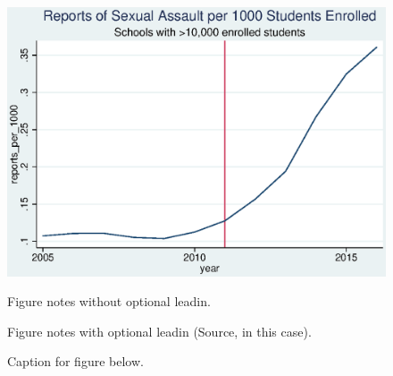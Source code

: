 \documentclass[AER]{AEA}
\begin{document}
\clearpage




\clearpage
\appendix


\begin{figure}

\includegraphics[width=4.9in]{figures/school_reports.eps}

\caption{Caption for figure below.}
\begin{figurenotes}
Figure notes without optional leadin.
\end{figurenotes}
\begin{figurenotes}[Source]
Figure notes with optional leadin (Source, in this case).
\end{figurenotes}
\end{figure}
\end{document}
